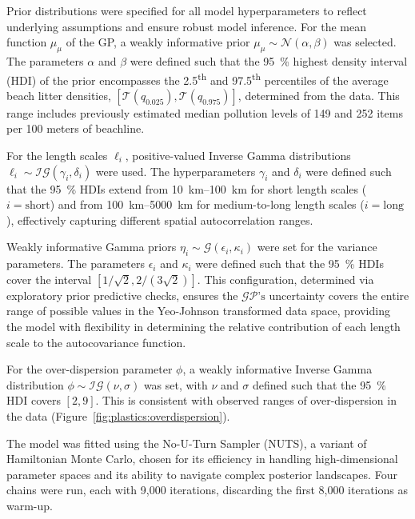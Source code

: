 Prior distributions were specified for all model hyperparameters to reflect underlying assumptions and ensure robust model inference. For the mean function $\mu_{\mu}$ of the GP, a weakly informative prior $\mu_{\mu} \sim \mathcal{N}(\alpha, \beta)$ was selected. The parameters $\alpha$ and $\beta$ were defined such that the \qty{95}{\percent} highest density interval (HDI) of the prior encompasses the 2.5\textsuperscript{th} and 97.5\textsuperscript{th} percentiles of the average beach litter densities, $\left[\mathcal{T}(q_{0.025}), \mathcal{T}(q_{0.975})\right]$, determined from the data. This range includes previously estimated median pollution levels of 149 \cite{hanke_eu_2019} and 252 \cite{lacroix_abundance_2023} items per 100 meters of beachline.

For the length scales $\ell_i$, positive-valued Inverse Gamma distributions $\ell_i \sim \mathcal{IG}(\gamma_i, \delta_i)$ were used. The hyperparameters $\gamma_i$ and $\delta_i$ were defined such that the \qty{95}{\percent} HDIs extend from \qtyrange{10}{100}{km} for short length scales ($i=\text{short}$) and from \qtyrange{100}{5000}{km} for medium-to-long length scales ($i=\text{long}$), effectively capturing different spatial autocorrelation ranges.

Weakly informative Gamma priors $\eta_i \sim \mathcal{G}(\epsilon_i, \kappa_i)$ were set for the variance parameters. The parameters $\epsilon_i$ and $\kappa_i$ were defined such that the \qty{95}{\percent} HDIs cover the interval $\left[1/\sqrt{2}, 2/(3\sqrt{2})\right]$. This configuration, determined via exploratory prior predictive checks, ensures the $\mathcal{GP}\text{'s}$ uncertainty covers the entire range of possible values in the Yeo-Johnson transformed data space, providing the model with flexibility in determining the relative contribution of each length scale to the autocovariance function.

For the over-dispersion parameter $\phi$, a weakly informative Inverse Gamma distribution $\phi \sim \mathcal{IG}(\nu, \sigma)$ was set, with $\nu$ and $\sigma$ defined such that the \qty{95}{\percent} HDI covers $\left[2, 9\right]$. This is consistent with observed ranges of over-dispersion in the data (Figure~\ref{fig:plastics:overdispersion}).

The model was fitted using the No-U-Turn Sampler \cite{hoffman_no-u-turn_2014} (NUTS), a variant of Hamiltonian Monte Carlo, chosen for its efficiency in handling high-dimensional parameter spaces and its ability to navigate complex posterior landscapes. Four chains were run, each with 9,000 iterations, discarding the first 8,000 iterations as warm-up.

